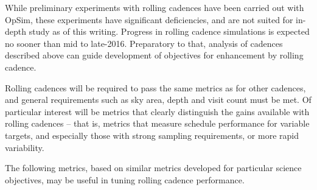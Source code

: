 While preliminary experiments with rolling cadences have been carried
out with OpSim, these experiments have significant deficiencies, and are
not suited for in-depth study as of this writing.  Progress in rolling
cadence simulations is expected no sooner than mid to late-2016.
Preparatory to that, analysis of cadences described above can guide
development of objectives for enhancement by rolling cadence.

Rolling cadences will be required to pass the same metrics as for other
cadences, and general requirements such as sky area, depth and visit
count must be met.  Of particular interest will be metrics that clearly
distinguish the gains available with rolling cadences -- that is,
metrics that measure schedule performance for variable targets, and
especially those with strong sampling requirements, or more rapid
variability.

The following metrics, based on similar metrics developed for particular
science objectives, may be useful in tuning rolling cadence performance.

